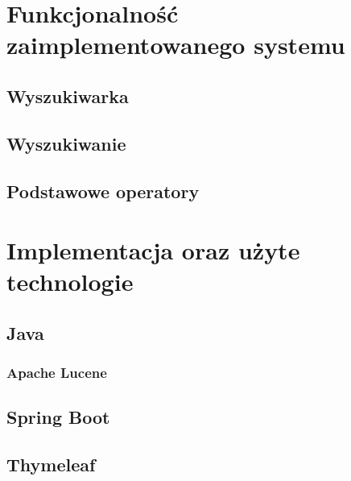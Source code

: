\documentclass[licencjacka]{pracadypl}
\theoremstyle{definition}
\newcommand{\linia}{\rule{\linewidth}{0.4mm}}
\begin{document}
\chapter{Funkcjonalność zaimplementowanego systemu}
%
\section{Wyszukiwarka}
\section{Wyszukiwanie}
\section{Podstawowe operatory}


\chapter{Implementacja oraz użyte technologie}
%
\section{Java}
\subsection{Apache Lucene}
\section{Spring Boot}
\section{Thymeleaf}
\end{document}
